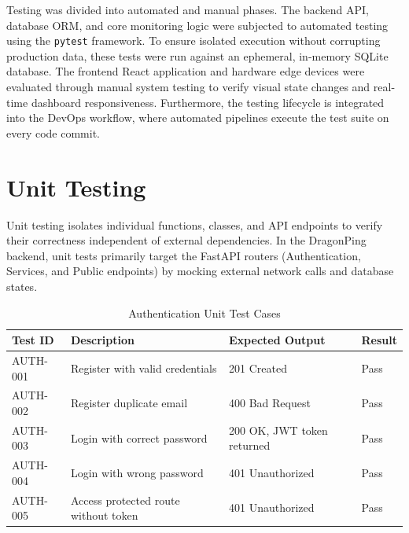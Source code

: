 \documentclass[12pt,a4paper,oneside]{report}
\begin{document}
\noindent Testing was divided into automated and manual phases. The backend API, database ORM, and core monitoring logic were subjected to automated testing using the \texttt{pytest} framework. To ensure isolated execution without corrupting production data, these tests were run against an ephemeral, in-memory SQLite database. The frontend React application and hardware edge devices were evaluated through manual system testing to verify visual state changes and real-time dashboard responsiveness. Furthermore, the testing lifecycle is integrated into the DevOps workflow, where automated pipelines execute the test suite on every code commit.

\section{Unit Testing}
\noindent Unit testing isolates individual functions, classes, and API endpoints to verify their correctness independent of external dependencies. In the DragonPing backend, unit tests primarily target the FastAPI routers (Authentication, Services, and Public endpoints) by mocking external network calls and database states.

\begin{table}[H]
\centering
\begin{tabularx}{\textwidth}{|l|X|X|l|}
\hline
\textbf{Test ID} & \textbf{Description} & \textbf{Expected Output} & \textbf{Result} \\
\hline
AUTH-001 & Register with valid credentials & 201 Created & Pass \\
\hline
AUTH-002 & Register duplicate email & 400 Bad Request & Pass \\
\hline
AUTH-003 & Login with correct password & 200 OK, JWT token returned & Pass \\
\hline
AUTH-004 & Login with wrong password & 401 Unauthorized & Pass \\
\hline
AUTH-005 & Access protected route without token & 401 Unauthorized & Pass \\
\hline
\end{tabularx}
\caption{Authentication Unit Test Cases}
\label{tab:test_auth}
\end{table}
\end{document}
